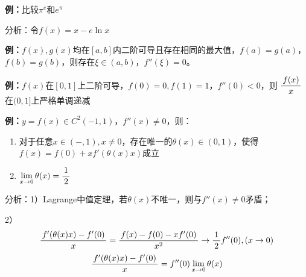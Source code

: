 {\bf 例：}比较$\pi^e$和$e^{\pi}$

分析：令$f(x)=x-e\ln x$

{\bf 例：}$f(x),g(x)$均在$[a,b]$内二阶可导且存在相同的最大值，$f(a)=g(a)$，
$f(b)=g(b)$，则存在$\xi\in(a,b)$，$f''(\xi)=0$。

{\bf 例：}$f(x)$在$[0,1]$上二阶可导，$f(0)=0,f(1)=1$，$f''(0)<0$，则
$\displaystyle\frac{\,{f(x)}\,}{\,{x}\,}$在$(0,1]$上严格单调递减

{\bf 例：}$y=f(x)\in C^2(-1,1)$，$f''(x)\ne 0$，则：
\begin{enumerate}[1)]
  \setlength{\itemindent}{1cm}
  \item 对于任意$x\in(-,1),x\ne 0$，存在唯一的$\theta(x)\in(0,1)$，使得
  $f(x)=f(0)+xf'(\theta(x)x)$成立
  \item $\lim\limits_{x\to{0}}\theta(x)=\displaystyle\frac{\,{1}\,}{\,{2}\,}$
\end{enumerate}

分析：1）Lagrange中值定理，若$\theta(x)$不唯一，则与$f''(x)\ne 0$矛盾；

2）
$$\displaystyle\frac{\,{f'(\theta(x)x)-f'(0)}\,}{\,{x}\,}=\displaystyle\frac{\,{f(x)-f(0)-xf'(0)}\,}{\,{x^2}\,}\to\displaystyle\frac{\,{1}\,}{\,{2}\,}f''(0),(x\to0)$$
$$\displaystyle\frac{\,{f'(\theta(x)x)-f'(0)}\,}{\,{x}\,}=f''(0)\lim\limits_{x\to{0}}\theta(x)$$